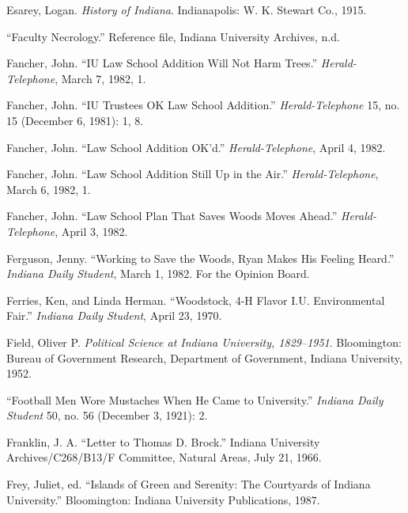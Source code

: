 \documentclass[
  american,
  letterpaper,
]{scrreprt}
\newlength{\cslhangindent}
\newenvironment{CSLReferences}[2] %
 {\begin{list}{}{%
  \setlength{\itemindent}{0pt}
  \setlength{\leftmargin}{0pt}
  \setlength{\parsep}{0pt}
  \ifodd #1
   \setlength{\leftmargin}{\cslhangindent}
   \setlength{\itemindent}{-1\cslhangindent}
  \fi
  \setlength{\itemsep}{#2\baselineskip}}}
 {\end{list}}
\begin{document}
\begin{CSLReferences}{1}{0}
Esarey, Logan. \emph{History of Indiana}. Indianapolis: W. K. Stewart
Co., 1915.

{``Faculty Necrology.''} Reference file, Indiana University Archives,
n.d.

Fancher, John. {``IU Law School Addition Will Not Harm Trees.''}
\emph{Herald-Telephone}, March 7, 1982, 1.

Fancher, John. {``IU Trustees OK Law School Addition.''}
\emph{Herald-Telephone} 15, no. 15 (December 6, 1981): 1, 8.

Fancher, John. {``Law School Addition OK'd.''} \emph{Herald-Telephone},
April 4, 1982.

Fancher, John. {``Law School Addition Still {Up} in the Air.''}
\emph{Herald-Telephone}, March 6, 1982, 1.

Fancher, John. {``Law School Plan That Saves Woods Moves Ahead.''}
\emph{Herald-Telephone}, April 3, 1982.

Ferguson, Jenny. {``Working to Save the Woods, Ryan Makes His Feeling
Heard.''} \emph{Indiana Daily Student}, March 1, 1982. For the Opinion
Board.

Ferries, Ken, and Linda Herman. {``{Woodstock, 4-H Flavor I.U.
Environmental Fair}.''} \emph{Indiana Daily Student}, April 23, 1970.

Field, Oliver P. \emph{Political Science at Indiana University,
1829--1951}. Bloomington: Bureau of Government Research, Department of
Government, Indiana University, 1952.

{``Football Men Wore Mustaches When He Came to University.''}
\emph{Indiana Daily Student} 50, no. 56 (December 3, 1921): 2.

Franklin, J. A. {``Letter to Thomas {D}. Brock.''} Indiana University
Archives/C268/B13/F Committee, Natural Areas, July 21, 1966.

Frey, Juliet, ed. {``Islands of Green and Serenity: The Courtyards of
Indiana University.''} Bloomington: Indiana University Publications,
1987.


\end{CSLReferences}
\end{document}
